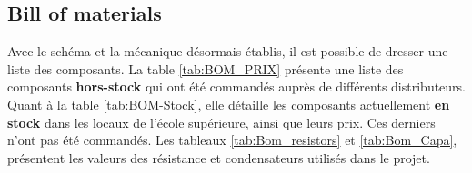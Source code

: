 \clearpage

\subsection{Bill of materials} \label{ssec:BOM}
Avec le schéma et la mécanique désormais établis, il est possible de dresser une liste des composants. La table \ref{tab:BOM_PRIX} présente une liste des composants \textbf{hors-stock} qui ont été commandés auprès de différents distributeurs. Quant à la table \ref{tab:BOM-Stock}, elle détaille les composants actuellement \textbf{en stock} dans les locaux de l'école supérieure, ainsi que leurs prix. Ces derniers n'ont pas été commandés. Les tableaux \ref{tab:Bom_resistors} et \ref{tab:Bom_Capa}, présentent les valeurs des résistance et condensateurs utilisés dans le projet.

